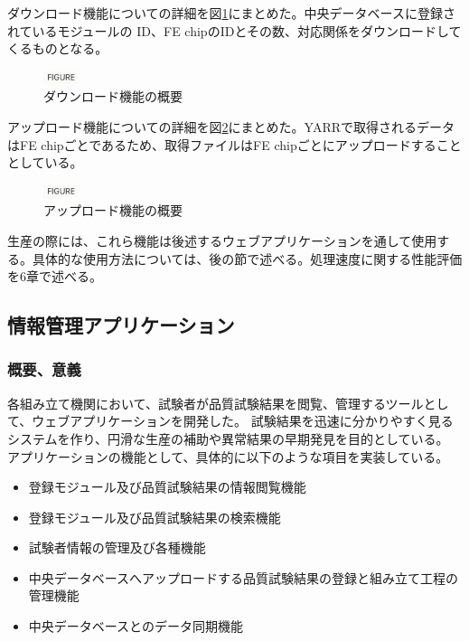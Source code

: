 ダウンロード機能についての詳細を図\ref{pd_download_info}にまとめた。中央データベースに登録されているモジュールの ID、FE chipのIDとその数、対応関係をダウンロードしてくるものとなる。
\begin{figure}[bpt]\centering
\includegraphics[width=1cm]{figure}
\caption[ダウンロード機能の概要]{ダウンロード機能の概要}
\label{pd_download_info}
\end{figure}

アップロード機能についての詳細を図\ref{pd_upload_info}にまとめた。YARRで取得されるデータはFE chipごとであるため、取得ファイルはFE chipごとにアップロードすることとしている。

\begin{figure}[bpt]\centering
\includegraphics[width=1cm]{figure}
\caption[アップロード機能の概要]{アップロード機能の概要}
\label{pd_upload_info}
\end{figure}

生産の際には、これら機能は後述するウェブアプリケーションを通して使用する。具体的な使用方法については、後の節で述べる。処理速度に関する性能評価を6章で述べる。

\subsection{情報管理アプリケーション}
\subsubsection{概要、意義}
各組み立て機関において、試験者が品質試験結果を閲覧、管理するツールとして、ウェブアプリケーションを開発した。
試験結果を迅速に分かりやすく見るシステムを作り、円滑な生産の補助や異常結果の早期発見を目的としている。
アプリケーションの機能として、具体的に以下のような項目を実装している。

\begin{itemize}
  \item 登録モジュール及び品質試験結果の情報閲覧機能
  \item 登録モジュール及び品質試験結果の検索機能
  \item 試験者情報の管理及び各種機能
  \item 中央データベースへアップロードする品質試験結果の登録と組み立て工程の管理機能
  \item 中央データベースとのデータ同期機能
\end{itemize}

